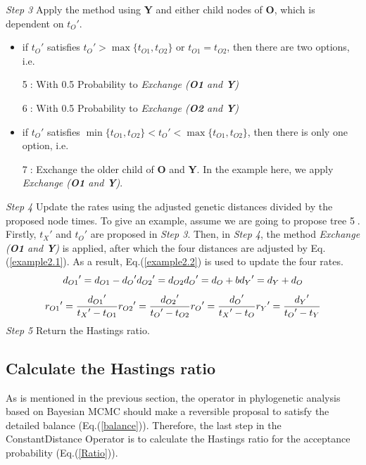 \documentclass{bmcart}
\begin{document}
\emph{Step 3} Apply the method using \textbf{Y} and either child nodes of \textbf{O}, which is dependent on ${t_O}'$.
\begin{itemize}
\item if ${t_O}'$ satisfies ${t_O}' > \max \{ {t_{O1}},{t_{O2}}\} $ or ${t_{O1}} = {t_{O2}}$, then there are two options, i.e.

\textcircled5: With 0.5 Probability to \textit{Exchange (\textbf{O1} and \textbf{Y})}

\textcircled6: With 0.5 Probability to \textit{Exchange (\textbf{O2} and \textbf{Y})}
\item if ${t_O}'$ satisfies $\min \{ {t_{O1}},{t_{O2}}\}  < {t_O}' < \max \{ {t_{O1}},{t_{O2}}\} $, then there is only one option, i.e.

\textcircled7: Exchange the older child of \textbf{O} and \textbf{Y}.  In the example here, we apply \textit{Exchange (\textbf{O1}  and \textbf{Y})}.
\end{itemize}

\emph{Step 4}  Update the rates using the adjusted genetic distances divided by the proposed node times. To give an example, assume we are going to propose tree \textcircled5. Firstly, ${t_X}'$ and ${t_O}'$ are proposed in \emph{Step 3}.  Then, in \emph{Step 4}, the method \textit{Exchange (\textbf{O1} and \textbf{Y})} is applied, after which the four distances are adjusted by Eq.(\ref{example2.1}). As a result, Eq.(\ref{example2.2}) is used to update the four rates.
\begin{equation}\label{example2.1}
{d_{O1}}' = {d_{O1}} - {d_O}'  \\
{d_{O2}}' = {d_{O2}}  \\
{d_O}' = {d_O} + b  \\
{d_Y}' = {d_Y} + {d_O} 
\end{equation}
\begin{equation}\label{example2.2}
{r_{O1}}' = \frac{{{d_{O1}}'}}{{{t_X}' - {t_{O1}}}} \\
{r_{O2}}' = \frac{{{d_{O2}}'}}{{{t_O}' - {t_{O2}}}} \\
{r_O}' = \frac{{{d_O}'}}{{{t_X}' - {t_O}}} \\
{r_Y}' = \frac{{{d_Y}'}}{{{t_O}' - {t_Y}}} 
\end{equation}
\emph{Step 5} Return the Hastings ratio.

\subsection*{Calculate the Hastings ratio}
As is mentioned in the previous section, the operator in phylogenetic analysis based on Bayesian MCMC should make a reversible proposal to satisfy the detailed balance (Eq.(\ref{balance})). Therefore, the last step in the ConstantDistance Operator is to calculate the Hastings ratio for the acceptance probability (Eq.(\ref{Ratio})). 
\end{document}
